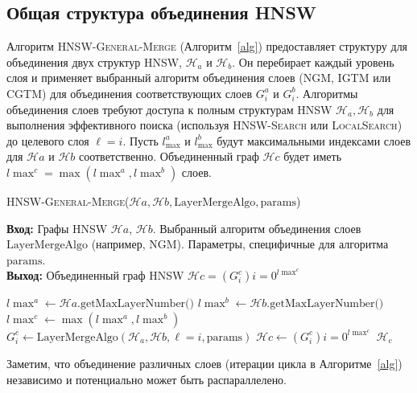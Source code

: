 \documentclass{article}
\begin{document}
\subsection{Общая структура объединения HNSW}
Алгоритм \textsc{HNSW-General-Merge} (Алгоритм~\ref{alg}) предоставляет структуру для объединения двух структур HNSW, $\mathcal{H}_a$ и $\mathcal{H}_b$. Он перебирает каждый уровень слоя и применяет выбранный алгоритм объединения слоев (\textsc{NGM}, \textsc{IGTM} или \textsc{CGTM}) для объединения соответствующих слоев $G^a_i$ и $G^b_i$. Алгоритмы объединения слоев требуют доступа к полным структурам HNSW $\mathcal{H}_a, \mathcal{H}_b$ для выполнения эффективного поиска (используя \textsc{HNSW-Search} или \textsc{LocalSearch}) до целевого слоя $\ell=i$.
Пусть $l_{\max}^a$ и $l_{\max}^b$ будут максимальными индексами слоев для $\mathcal{H}a$ и $\mathcal{H}b$ соответственно. Объединенный граф $\mathcal{H}c$ будет иметь $l{\max}^c = \max(l{\max}^a, l{\max}^b)$ слоев.
\begin{algorithm}
\caption{\textsc{HNSW-General-Merge}($\mathcal{H}a, \mathcal{H}b, \text{LayerMergeAlgo}, \text{params}$)}\label{alg}
\textbf{Вход:} Графы HNSW $\mathcal{H}a$, $\mathcal{H}b $. Выбранный алгоритм объединения слоев $\text{LayerMergeAlgo}$ (например, \textsc{NGM}). Параметры, специфичные для алгоритма $\text{params}$. \\
\textbf{Выход:} Объединенный граф HNSW $\mathcal{H}c = (G^c_i){i=0}^{l{\max}^c}$
\begin{algorithmic}[1]
\State $l{\max}^a \gets \mathcal{H}a.\text{getMaxLayerNumber()}$
\State $l{\max}^b \gets \mathcal{H}b.\text{getMaxLayerNumber()}$
\State $l{\max}^c \gets \max(l{\max}^a, l{\max}^b)$
 
\State $G^c_i \gets \text{LayerMergeAlgo}(\mathcal{H}_a, \mathcal{H}b, \ell=i, \text{params})$ 
\EndFor
\State $\mathcal{H}c \gets (G^c_i){i=0}^{l{\max}^c}$ %
\State \Return $\mathcal{H}_c$
\end{algorithmic}
\end{algorithm}
Заметим, что объединение различных слоев (итерации цикла в Алгоритме~\ref{alg}) независимо и потенциально может быть распараллелено.
\end{document}

